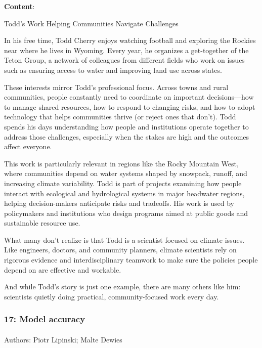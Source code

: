 \documentclass[
  letterpaper,
  DIV=11,
  numbers=noendperiod]{scrartcl}
\makeatletter
\let\oldparagraph\paragraph
\renewcommand{\paragraph}{
    \@ifstar
      \xxxParagraphStar
      \xxxParagraphNoStar
  }
\newcommand{\xxxParagraphStar}[1]{\oldparagraph*{#1}\mbox{}}
\newcommand{\xxxParagraphNoStar}[1]{\oldparagraph{#1}\mbox{}}
\makeatother
\begin{document}
\textbf{Content}:

Todd's Work Helping Communities Navigate Challenges

In his free time, Todd Cherry enjoys watching football and exploring the
Rockies near where he lives in Wyoming. Every year, he organizes a
get-together of the Teton Group, a network of colleagues from different
fields who work on issues such as ensuring access to water and improving
land use across states.

These interests mirror Todd's professional focus. Across towns and rural
communities, people constantly need to coordinate on important
decisions---how to manage shared resources, how to respond to changing
risks, and how to adopt technology that helps communities thrive (or
reject ones that don't). Todd spends his days understanding how people
and institutions operate together to address those challenges,
especially when the stakes are high and the outcomes affect everyone.

This work is particularly relevant in regions like the Rocky Mountain
West, where communities depend on water systems shaped by snowpack,
runoff, and increasing climate variability. Todd is part of projects
examining how people interact with ecological and hydrological systems
in major headwater regions, helping decision-makers anticipate risks and
tradeoffs. His work is used by policymakers and institutions who design
programs aimed at public goods and sustainable resource use.

What many don't realize is that Todd is a scientist focused on climate
issues. Like engineers, doctors, and community planners, climate
scientists rely on rigorous evidence and interdisciplinary teamwork to
make sure the policies people depend on are effective and workable.

And while Todd's story is just one example, there are many others like
him: scientists quietly doing practical, community-focused work every
day.

\subsubsection{17: Model accuracy}\label{model-accuracy}

\paragraph{Authors: Piotr Lipinski; Malte
Dewies}\label{authors-piotr-lipinski-malte-dewies}
\end{document}
